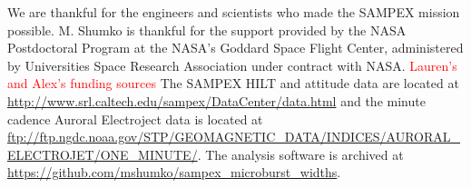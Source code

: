 \documentclass[draft]{agujournal2019}
\begin{document}
%
%
%
%

\acknowledgments
We are thankful for the engineers and scientists who made the SAMPEX mission possible. M. Shumko is thankful for the support provided by the NASA Postdoctoral Program at the NASA’s Goddard Space Flight Center, administered by Universities Space Research Association under contract with NASA. \textcolor{red}{Lauren's and Alex's funding sources} The SAMPEX HILT and attitude data are located at \url{http://www.srl.caltech.edu/sampex/DataCenter/data.html} and the minute cadence Auroral Electroject data is located at \url{ftp://ftp.ngdc.noaa.gov/STP/GEOMAGNETIC_DATA/INDICES/AURORAL_ELECTROJET/ONE_MINUTE/}.
The analysis software is archived at \textcolor{red}{\url{https://github.com/mshumko/sampex_microburst_widths}}.



%
%





%
%
%
%
%
\end{document}
